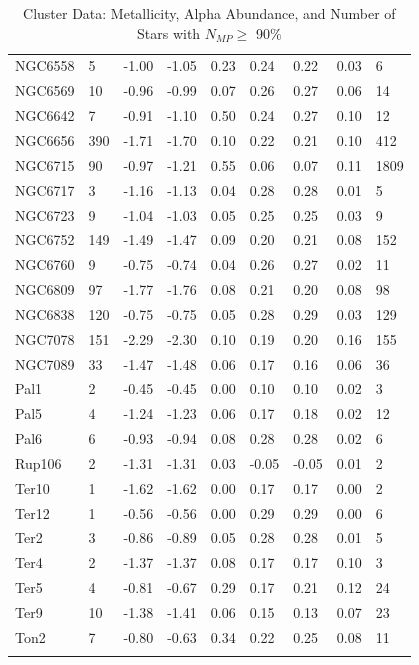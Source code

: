 \documentclass[a4paper,12pt]{article}
\begin{document}
\begin{small}
\begin{center}
\begin{longtable}{|p{2cm}|p{1cm}|p{1.5cm}|p{1.5cm}|p{1.5cm}|p{1.5cm}|p{1.5cm}|p{1.5cm}|p{2cm}|}
      NGC6558 & 5 & -1.00 & -1.05 & 0.23 & 0.24 & 0.22 & 0.03 &6\\
      NGC6569 & 10 & -0.96 & -0.99 & 0.07 & 0.26 & 0.27 & 0.06 &14\\
      NGC6642 & 7 & -0.91 & -1.10 & 0.50 & 0.24 & 0.27 & 0.10 &12\\
      NGC6656 & 390 & -1.71 & -1.70 & 0.10 & 0.22 & 0.21 & 0.10 &412\\
      NGC6715 & 90 & -0.97 & -1.21 & 0.55 & 0.06 & 0.07 & 0.11 &1809\\
      NGC6717 & 3 & -1.16 & -1.13 & 0.04 & 0.28 & 0.28 & 0.01 &5\\
      NGC6723 & 9 & -1.04 & -1.03 & 0.05 & 0.25 & 0.25 & 0.03 &9\\
      NGC6752 & 149 & -1.49 & -1.47 & 0.09 & 0.20 & 0.21 & 0.08 &152\\
      NGC6760 & 9 & -0.75 & -0.74 & 0.04 & 0.26 & 0.27 & 0.02 &11\\
      NGC6809 & 97 & -1.77 & -1.76 & 0.08 & 0.21 & 0.20 & 0.08 &98\\
      NGC6838 & 120 & -0.75 & -0.75 & 0.05 & 0.28 & 0.29 & 0.03 &129\\
      NGC7078 & 151 & -2.29 & -2.30 & 0.10 & 0.19 & 0.20 & 0.16 &155\\
      NGC7089 & 33 & -1.47 & -1.48 & 0.06 & 0.17 & 0.16 & 0.06 &36\\
      Pal1 & 2 & -0.45 & -0.45 & 0.00 & 0.10 & 0.10 & 0.02 &3\\
      Pal5 & 4 & -1.24 & -1.23 & 0.06 & 0.17 & 0.18 & 0.02 &12\\
      Pal6 & 6 & -0.93 & -0.94 & 0.08 & 0.28 & 0.28 & 0.02 &6\\
      Rup106 & 2 & -1.31 & -1.31 & 0.03 & -0.05 & -0.05 & 0.01 &2\\
      Ter10 & 1 & -1.62 & -1.62 & 0.00 & 0.17 & 0.17 & 0.00 &2\\
      Ter12 & 1 & -0.56 & -0.56 & 0.00 & 0.29 & 0.29 & 0.00 &6\\
      Ter2 & 3 & -0.86 & -0.89 & 0.05 & 0.28 & 0.28 & 0.01 &5\\
      Ter4 & 2 & -1.37 & -1.37 & 0.08 & 0.17 & 0.17 & 0.10 &3\\
      Ter5 & 4 & -0.81 & -0.67 & 0.29 & 0.17 & 0.21 & 0.12 &24\\
      Ter9 & 10 & -1.38 & -1.41 & 0.06 & 0.15 & 0.13 & 0.07 &23\\
      Ton2 & 7 & -0.80 & -0.63 & 0.34 & 0.22 & 0.25 & 0.08 &11\\
      
\hline
    \caption{Cluster Data: Metallicity, Alpha Abundance, and Number of Stars with $N_{MP} \geq$ 90\%}
    \label{tab:cluster_data}
\end{longtable}
\end{center}
\end{small}
\end{document}
